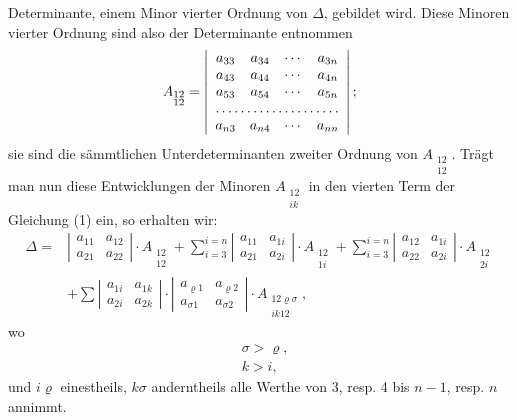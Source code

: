 Determinante, einem Minor vierter Ordnung von $\Delta$, gebildet wird. Diese Minoren vierter Ordnung sind also der Determinante entnommen
\[
A_{\substack{12\\12}} = \left|\begin{array}{cccc}
a_{33} & a_{34} & \cdots & a_{3n}\\
a_{43} & a_{44} & \cdots & a_{4n}\\
a_{53} & a_{54} & \cdots & a_{5n}\\
\hdotsfor{4}\\
a_{n3} & a_{n4} & \cdots & a_{nn}
\end{array}\right|;
\]
sie sind die sämmtlichen Unterdeterminanten zweiter Ordnung von $A_{\substack{12\\12}}$. Trägt man nun diese Entwicklungen der Minoren $A_{\substack{12\\ik}}$ in den vierten Term der Gleichung (1) ein, so erhalten wir:
\[
\begin{aligned}
\Delta = {}& \left|\begin{array}{cc} a_{11} & a_{12}\\ a_{21} & a_{22}\end{array}\right|\cdot A_{\substack{12\\12}}
+ \sum_{i=3}^{i=n}\left|\begin{array}{cc} a_{11} & a_{1i}\\ a_{21} & a_{2i}\end{array}\right|\cdot A_{\substack{12\\1i}}
+ \sum_{i=3}^{i=n}\left|\begin{array}{cc} a_{12} & a_{1i}\\ a_{22} & a_{2i}\end{array}\right|\cdot A_{\substack{12\\2i}}\\
&+ \sum \left|\begin{array}{cc} a_{1i} & a_{1k}\\ a_{2i} & a_{2k}\end{array}\right|\cdot \left|\begin{array}{cc} a_{\varrho1} & a_{\varrho2}\\ a_{\sigma1} & a_{\sigma2}\end{array}\right|\cdot A_{\substack{12\varrho\sigma\\ik12}},
\end{aligned}
\]
wo
\[
\begin{aligned}
&\sigma>\varrho,\\
&k>i,
\end{aligned}
\]
und $i\varrho$ einestheils, $k\sigma$ anderntheils alle Werthe von 3, resp. 4 bis $n-1$, resp. $n$ annimmt.

